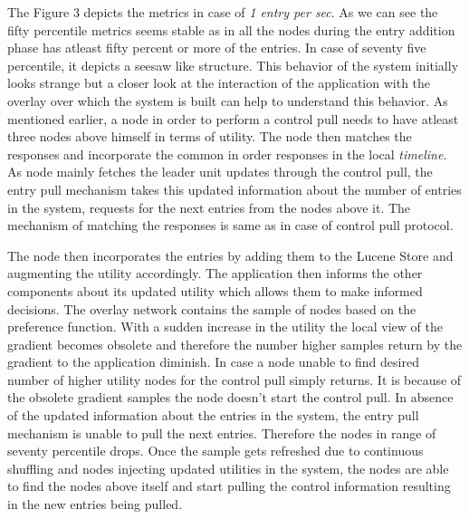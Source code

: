 \documentclass[12pt,a4paper,twoside,openright]{book}
\begin{document}
\par The Figure 3 depicts the metrics in case of \textit{1 entry per sec}. As we can see the fifty percentile metrics seems stable as in all the nodes during the entry addition phase has atleast fifty percent or more of the entries. In case of seventy five percentile, it depicts a seesaw like structure. This behavior of the system initially looks strange but a closer look at the interaction of the application with the overlay over which the system is built can help to understand this behavior. As mentioned earlier, a node in order to perform a control pull needs to have atleast three nodes above himself in terms of utility. The node then matches the responses and incorporate the common in order responses in the local \textit{timeline}. As node mainly fetches the leader unit updates through the control pull, the entry pull mechanism takes this updated information about the number of entries in the system, requests for the next entries from the nodes above it. The mechanism of matching the responses is same as in case of control pull protocol. 
\par The node then incorporates the entries by adding them to the Lucene Store and augmenting the utility accordingly. The application then informs the other components about its updated utility which allows them to make informed decisions. The overlay network contains the sample of nodes based on the preference function. With a sudden increase in the utility the local view of the gradient becomes obsolete and therefore the number higher samples return by the gradient to the application diminish. In case a node unable to find desired number of higher utility nodes for the control pull simply returns. It is because of the obsolete gradient samples the node doesn't start the control pull. In absence of the updated information about the entries in the system, the entry pull mechanism is unable to pull the next entries. Therefore the nodes in range of seventy percentile drops. Once the sample gets refreshed due to continuous shuffling and nodes injecting updated utilities in the system, the nodes are able to find the nodes above itself and start pulling the control information  resulting in the new entries being pulled.
\end{document}
